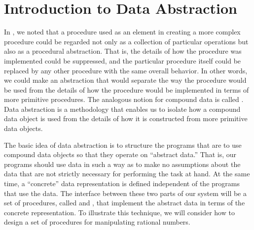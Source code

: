 \section{Introduction to Data Abstraction}
\label{Section 2.1}

In , we noted that a procedure used as an element in
creating a more complex procedure could be regarded not only as a collection of
particular operations but also as a procedural abstraction.  That is, the
details of how the procedure was implemented could be suppressed, and the
particular procedure itself could be replaced by any other procedure with the
same overall behavior.  In other words, we could make an abstraction that would
separate the way the procedure would be used from the details of how the
procedure would be implemented in terms of more primitive procedures.  The
analogous notion for compound data is called .  Data
abstraction is a methodology that enables us to isolate how a compound data
object is used from the details of how it is constructed from more primitive
data objects.

The basic idea of data abstraction is to structure the programs that are to use
compound data objects so that they operate on ``abstract data.'' That is, our
programs should use data in such a way as to make no assumptions about the data
that are not strictly necessary for performing the task at hand.  At the same
time, a ``concrete'' data representation is defined independent of the programs
that use the data.  The interface between these two parts of our system will be
a set of procedures, called  and ,
that implement the abstract data in terms of the concrete representation.  To
illustrate this technique, we will consider how to design a set of procedures
for manipulating rational numbers.



